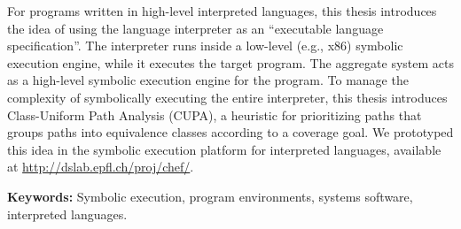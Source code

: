 For programs written in high-level interpreted languages, this thesis introduces the idea of using the language interpreter as an ``executable language specification''.  The interpreter runs inside a low-level (e.g., x86) symbolic execution engine, while it executes the target program.  The aggregate system acts as a high-level symbolic execution engine for the program.
%
To manage the complexity of symbolically executing the entire interpreter, this thesis introduces Class-Uniform Path Analysis (CUPA), a heuristic for prioritizing paths that groups paths into equivalence classes according to a coverage goal.
%
We prototyped this idea in the \emph{\chef} symbolic execution platform for interpreted languages, available at {\url{http://dslab.epfl.ch/proj/chef/}}.

\noindent \textbf{Keywords:} Symbolic execution, program environments, systems software, interpreted languages.


